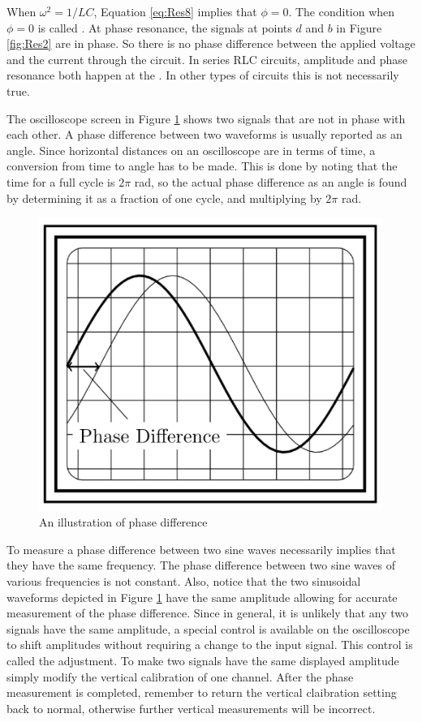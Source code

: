 \noindent When $\omega^2 = 1/LC$, Equation \ref{eq:Res8} implies that $\phi = 0$. The condition when $\phi = 0$ is called . At phase resonance, the signals at points $d$ and $b$ in Figure \ref{fig:Res2} are in phase. So there is no phase difference between the applied voltage and the current through the circuit. In series RLC circuits, amplitude and phase resonance both happen at the . In other types of circuits this is not necessarily true.

\noindent The oscilloscope screen in Figure \ref{fig:Res3} shows two signals that are not in phase with each other. A phase difference between two waveforms is usually reported as an angle. Since horizontal distances on an oscilloscope are in terms of time, a conversion from time to angle has to be made. This is done by noting that the time for a full cycle is $2\pi$ rad, so the actual phase difference as an angle is found by determining it as a fraction of one cycle, and multiplying by $2\pi$ rad.

\begin{figure}[H]
    \centering
    \includegraphics[scale = 0.8]{Images/Res3.PNG}
    \caption{An illustration of phase difference}
    \label{fig:Res3}
\end{figure}

To measure a phase difference between two sine waves necessarily implies that they have the same frequency. The phase difference between two sine waves of various frequencies is not constant. Also, notice that the two sinusoidal waveforms depicted in Figure \ref{fig:Res3} have the same amplitude allowing for accurate measurement of the phase difference. Since in general, it is unlikely that any two signals have the same amplitude, a special control is available on the oscilloscope to shift amplitudes without requiring a change to the input signal. This control is called the  adjustment. To make two signals have the same displayed amplitude simply modify the vertical calibration of one channel. After the phase measurement is completed, remember to return the vertical claibration setting back to normal, otherwise further vertical measurements will be incorrect.

